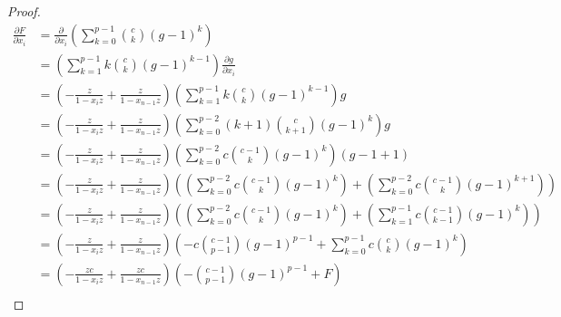 \documentclass{article}
\numberwithin{equation}{section}
\begin{document}
\begin{proof}
\begin{align*}
\frac{\partial F}{\partial x_i}&=\frac{\partial}{\partial x_i}\left(\sum_{k=0}^{p-1} \binom{c}{k} (g-1)^k\right)\\
&=\left(\sum_{k=1}^{p-1}k\binom{c}{k}(g-1)^{k-1}\right)\frac{\partial g}{\partial x_i}\\
&=\left(-\frac{z}{1-x_iz}+\frac{z}{1-x_{n-1}z}\right)\left(\sum_{k=1}^{p-1}k\binom{c}{k}(g-1)^{k-1}\right)g\\
&=\left(-\frac{z}{1-x_iz}+\frac{z}{1-x_{n-1}z}\right)\left(\sum_{k=0}^{p-2}(k+1)\binom{c}{k+1}(g-1)^{k}\right)g\\
&=\left(-\frac{z}{1-x_iz}+\frac{z}{1-x_{n-1}z}\right)\left(\sum_{k=0}^{p-2}c\binom{c-1}{k}(g-1)^{k}\right)(g-1+1)\\
&=\left(-\frac{z}{1-x_iz}+\frac{z}{1-x_{n-1}z}\right)\left(\left(\sum_{k=0}^{p-2}c\binom{c-1}{k}(g-1)^{k}\right)+\left(\sum_{k=0}^{p-2}c\binom{c-1}{k}(g-1)^{k+1}\right)\right)\\
&=\left(-\frac{z}{1-x_iz}+\frac{z}{1-x_{n-1}z}\right)\left(\left(\sum_{k=0}^{p-2}c\binom{c-1}{k}(g-1)^{k}\right)+\left(\sum_{k=1}^{p-1}c\binom{c-1}{k-1}(g-1)^{k}\right)\right)\\
&=\left(-\frac{z}{1-x_iz}+\frac{z}{1-x_{n-1}z}\right)\left(-c\binom{c-1}{p-1}(g-1)^{p-1}+\sum_{k=0}^{p-1}c\binom{c}{k}(g-1)^{k}\right)\\
&=\left(-\frac{zc}{1-x_iz}+\frac{zc}{1-x_{n-1}z}\right)\left(-\binom{c-1}{p-1}(g-1)^{p-1}+F\right)\\
\end{align*}

\end{proof}
\end{document}
